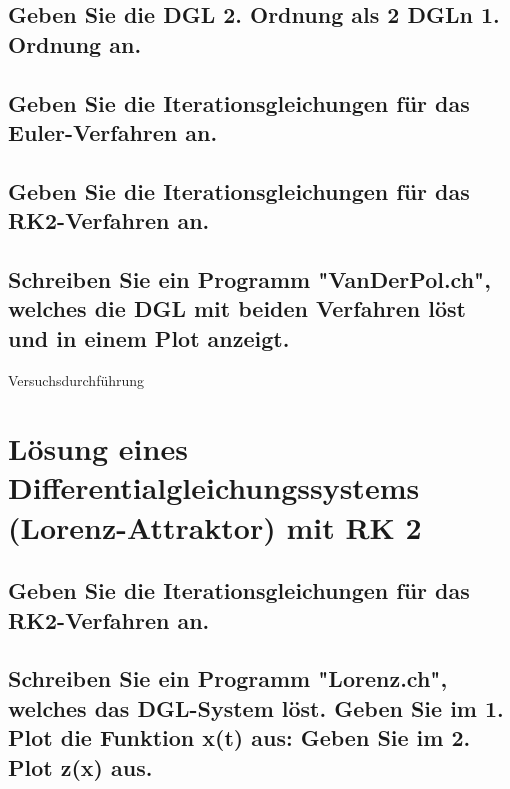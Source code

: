 \documentclass[10pt,a4paper]{article}
\begin{document}
\subsection{Geben Sie die DGL 2. Ordnung als 2 DGLn 1. Ordnung an.}
\subsection{Geben Sie die Iterationsgleichungen für das Euler-Verfahren an.}
\subsection{Geben Sie die Iterationsgleichungen für das RK2-Verfahren an.}
\subsection{Schreiben Sie ein Programm "VanDerPol.ch", welches die DGL mit beiden
Verfahren löst und in einem Plot anzeigt.}

\begin{center}
\begin{large}
Versuchsdurchführung
\end{large}
\end{center}

\section{Lösung eines Differentialgleichungssystems (Lorenz-Attraktor) mit RK 2}
\subsection{Geben Sie die Iterationsgleichungen für das RK2-Verfahren an.}
\subsection{Schreiben Sie ein Programm "Lorenz.ch", welches das DGL-System löst.
Geben Sie im 1. Plot die Funktion x(t) aus:
Geben Sie im 2. Plot z(x) aus.}
\end{document}
